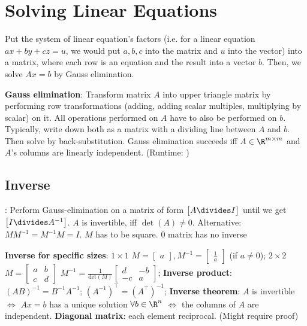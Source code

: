 \newsectionNoPB
\vspace{-0.5pc}
\section{Solving Linear Equations}
\label{sec:sle}
Put the system of linear equation's factors (i.e. for a linear equation $ax + by + cz = u$, we would put $a, b, c$ into the matrix and $u$ into the vector) into a matrix, where each row is an equation and the result into a vector $b$. Then, we solve $Ax = b$ by Gauss elimination.

\textbf{Gauss elimination}: Transform matrix $A$ into upper triangle matrix by performing row transformations (adding, adding scalar multiples, multiplying by scalar) on it. All operations performed on $A$ have to also be performed on $b$. Typically, write down both as a matrix with a dividing line between $A$ and $b$. Then solve by back-substitution. Gauss elimination succeeds iff $A \in \R^{m \times m}$ and $A$'s columns are linearly independent. (Runtime: )

\vspace{-0.5pc}
\subsection{Inverse}
\label{sec:inverse}
\setcounter{all}{7}: Perform Gauss-elimination on a matrix of form $\begin{bmatrix}A \divides I\end{bmatrix}$ until we get $\begin{bmatrix}I \divides A^{-1}\end{bmatrix}$. $A$ is invertible, iff $\det(A) \neq 0$. Alternative: $MM^{-1} = M^{-1}M = I$. $M$ has to be square. $0$ matrix has no inverse

\textbf{Inverse for specific sizes}: $1 \times 1$ $M = \begin{bmatrix}a\end{bmatrix}, M^{-1} = \begin{bmatrix}\frac{1}{a}\end{bmatrix}$ (if $a \neq 0$); $2\times2$ $M = \begin{bmatrix}a & b\\ c & d\end{bmatrix}$ $M^{-1} = \frac{1}{\text{det}(M)}\begin{bmatrix}d & -b\\ -c & a\end{bmatrix}$;
\setcounter{all}{9}\shortlemma \textbf{Inverse product}: $(AB)^{-1} = B^{-1} A^{-1}$;
\shortlemma $(A^{-1})^{\top} = (A^{\top})^{-1}$;
\shorttheorem \textbf{Inverse theorem}: $A$ is invertible $\Leftrightarrow$ $Ax = b$ has a unique solution $\forall b \in \R^n$ $\Leftrightarrow$ the columns of $A$ are independent. \textbf{Diagonal matrix}: each element reciprocal. (Might require proof)


